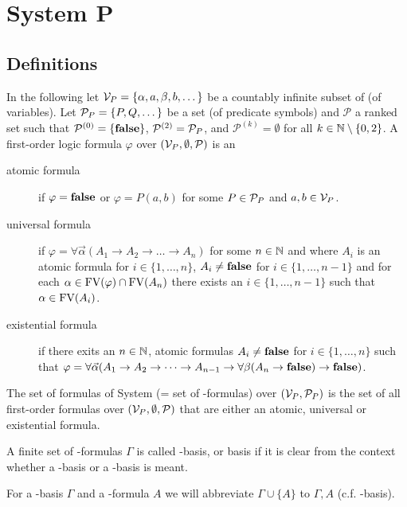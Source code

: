 \section{System P}
\subsection{Definitions}
In the following let $\mathcal{V}_P=\{\alpha,a,\beta,b,\dots\}$ be a countably infinite subset of \lambdaTypVar{} (of variables). 
Let $\mathcal{P}_P=\{P,Q,\dots\}$ be a set (of predicate symbols) and $\mathcal{P}$ a ranked set such that $\mathcal{P}^{(0)}=\{\textbf{false}\}$, $\mathcal{P}^{(2)}=\mathcal{P}_P$, and $\mathcal{P}^{(k)}=\emptyset$ for all $k\in\mathbb{N}\setminus\{0,2\}$.
A first-order logic formula $\varphi$ over $(\mathcal{V}_P,\emptyset,\mathcal{P})$ is an
\begin{description} %
	\item[atomic formula] if $\varphi=\textbf{false}$ or $\varphi=P(a,b)$ for some $P\in\mathcal{P}_P$ and $a,b\in\mathcal{V}_P$.
	\item[universal formula] if $\varphi=\forall\vec{\alpha}(A_1\to A_2 \to\dots\to A_n)$ for some $n\in\mathbb{N}$ and where $A_i$ is an atomic formula for $i\in\{1,\dots,n\}$, $A_i\neq\textbf{false}$ for $i\in\{1,\dots,n-1\}$ and for each $\alpha\in\text{FV}(\varphi)\cap\text{FV}(A_n)$ there exists an $i\in\{1,\dots,n-1\}$ such that $\alpha\in\text{FV}(A_i)$.
	\item[existential formula] if there exits an $n\in\mathbb{N}$, atomic formulas $A_i\neq\textbf{false}$ for $i\in\{1,\dots,n\}$ such that $\varphi=\forall\vec{\alpha}(A_1\to A_2 \to\dots\to A_{n-1}\to\forall\beta(A_n\to\textbf{false})\to\textbf{false})$.
\end{description}
The set of formulas of System \SysP{} (= set of \SysP-formulas) over $(\mathcal{V}_P,\mathcal{P}_P)$ is the set of all first-order formulas over $(\mathcal{V}_P,\emptyset,\mathcal{P})$ that are either an atomic, universal or existential formula.

\begin{definition}
A finite set of \SysP-formulas $\Gamma$ is called \SysP-basis, or basis if it is clear from the context whether a \SysP-basis or a \lambdaTwo-basis is meant.
\end{definition}

For a \SysP-basis $\Gamma$ and a \SysP-formula $A$ we will abbreviate $\Gamma\cup\{A\}$ to $\Gamma,A$ (c.f. \lambdaTwo-basis).

